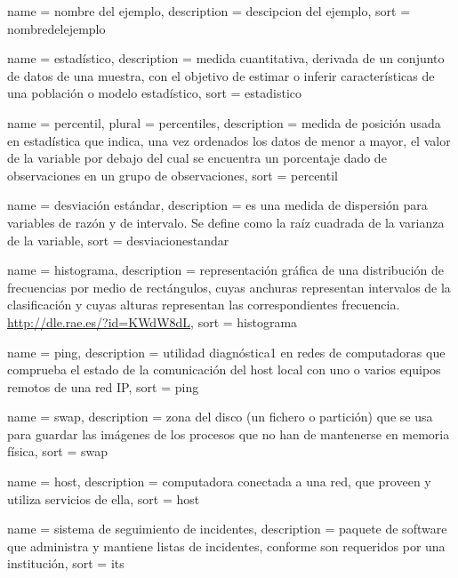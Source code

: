 \newpage
 {
  name = {nombre del ejemplo},
  description = {descipcion del ejemplo},
  sort = {nombredelejemplo}
}

 {
  name        = {estadístico},
  description =
    {medida cuantitativa, derivada de un conjunto de datos de una muestra, con
    el objetivo de estimar o inferir características de una población o modelo
    estadístico},
  sort        = {estadistico}
}

 {
  name        = {percentil},
  plural      = {percentiles},
  description =
    {medida de posición usada en estadística que indica, una vez ordenados los
    datos de menor a mayor, el valor de la variable por debajo del cual se
    encuentra un porcentaje dado de observaciones en un grupo de observaciones},
  sort        = {percentil}
}

 {
  name        = {desviación estándar},
  description =
    {es una medida de dispersión para variables de razón y de intervalo. Se
    define como la raíz cuadrada de la varianza de la variable},
  sort        = {desviacionestandar}
}

 {
  name        = {histograma},
  description =
    {representación gráfica de una distribución de frecuencias por medio de
    rectángulos, cuyas anchuras representan intervalos de la clasificación y
    cuyas alturas representan las correspondientes frecuencia.
    \url{http://dle.rae.es/?id=KWdW8dL}},
  sort        = {histograma}
}

 {
  name        = {ping},
  description =
    {utilidad diagnóstica1 en redes de computadoras que comprueba el estado de
    la comunicación del host local con uno o varios equipos remotos de una red
    IP},
  sort        = {ping}
}

 {
  name        = {swap},
  description =
    {zona del disco (un fichero o partición) que se usa para guardar las
    imágenes de los procesos que no han de mantenerse en memoria física},
  sort        = {swap}
}

 {
  name        = {host},
  description =
    {computadora conectada a una red, que proveen y utiliza servicios de ella},
  sort        = {host}
}

 {
  name        = {sistema de seguimiento de incidentes},
  description =
    {paquete de software que administra y mantiene listas de incidentes,
    conforme son requeridos por una institución},
  sort        = {its}
}

